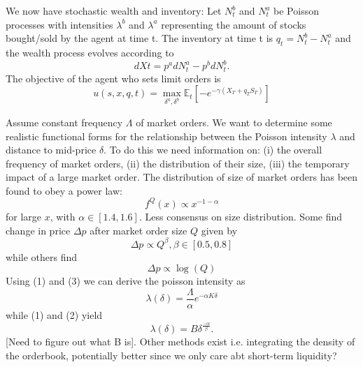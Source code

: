 We now have stochastic wealth and inventory: Let $N^b_t$ and $N^a_t$ be Poisson processes with intensities $\lambda^b$ and $\lambda^a$ representing the amount of stocks bought/sold by the agent at time t. The inventory at time t is $q_t=N^b_t-N^a_t$ and the wealth process evolves according to
$$dXt=p^adN^a_t-p^bdN^b_t.$$
The objective of the agent who sets limit orders is 
$$u(s,x,q,t)=\max\limits_{\delta^a,\delta^b}\mathbb{E}_t\left[-e^{-\gamma(X_T+q_TS_T)}\right]$$

Assume constant frequency $\Lambda$ of market orders. We want to determine some realistic functional forms for the relationship between the Poisson intensity $\lambda$ and distance to mid-price $\delta$. 
To do this we need information on: (i) the overall frequency of market orders, (ii) the distribution of their size, (iii) the temporary impact of a large market order. The distribution of size of market orders has been found to obey a power law:
\begin{equation}
    f^{Q}(x)\propto x^{-1-\alpha}
\end{equation}
for large $x$, with $\alpha\in[1.4,1.6].$
Less consensus on size distribution. Some find change in price $\Delta p$ after market order size $Q$ given by 
\begin{equation}
    \Delta p\propto Q^\beta, \beta\in[0.5,0.8]
\end{equation}
while others find
\begin{equation}
    \Delta p\propto\log(Q)
\end{equation}
Using (1) and (3) we can derive the poisson intensity as
$$\lambda(\delta)=\frac{\Lambda}{\alpha}e^{-\alpha K\delta}$$
while (1) and (2) yield
$$\lambda(\delta)=B\delta^{\frac{-\alpha}{\beta}}.$$
[Need to figure out what B is]. Other methods exist i.e. integrating the density of the orderbook, potentially better since we only care abt short-term liquidity?


